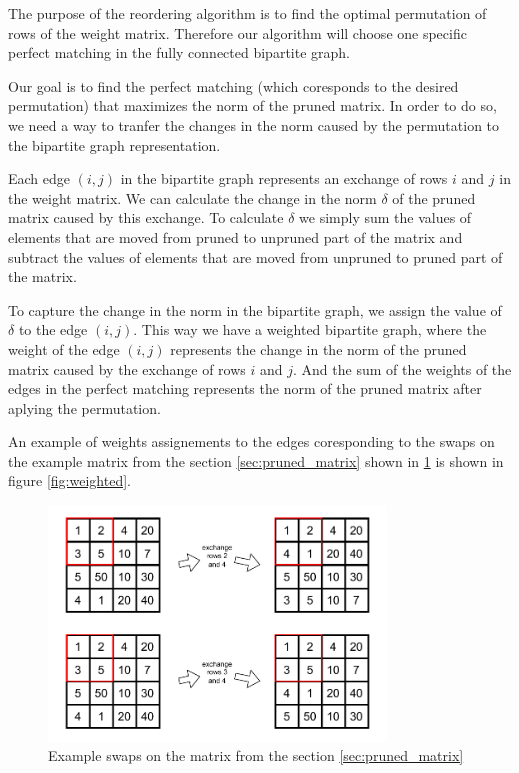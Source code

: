 The purpose of the reordering algorithm is to find the optimal permutation of rows of the weight matrix. Therefore our algorithm will choose one specific perfect matching in the fully connected bipartite graph.

Our goal is to find the perfect matching (which coresponds to the desired permutation) that maximizes the norm of the pruned matrix. In order to do so, we need a way to tranfer the changes in the norm caused by the permutation to the bipartite graph representation.

Each edge $(i ,j)$ in the bipartite graph represents an exchange of rows $i$ and $j$ in the weight matrix. We can calculate the change in the norm $\delta$ of the pruned matrix caused by this exchange. To calculate $\delta$ we simply sum the values of elements that are moved from pruned to unpruned part of the matrix and subtract the values of elements that are moved from unpruned to pruned part of the matrix.

To capture the change in the norm in the bipartite graph, we assign the value of $\delta$ to the edge $(i, j)$. This way we have a weighted bipartite graph, where the weight of the edge $(i, j)$ represents the change in the norm of the pruned matrix caused by the exchange of rows $i$ and $j$. And the sum of the weights of the edges in the perfect matching represents the norm of the pruned matrix after aplying the permutation.

An example of weights assignements to the edges coresponding to the swaps on the example matrix from the section \ref{sec:pruned_matrix} shown in \ref{fig:norm-change} is shown in figure \ref{fig:weighted}.

\begin{figure}[h]
    \centerline{\includegraphics[width=0.8\textwidth]{images/norm-change}}
    \caption[Swaps on the matrix]{Example swaps on the matrix from the section \ref{sec:pruned_matrix}}
    \label{fig:norm-change}
\end{figure}

